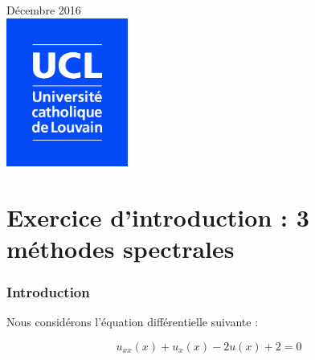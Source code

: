 \documentclass{report}
\begin{document}
\begin{titlepage}


{\large Décembre 2016}\\[1.5cm] %


\includegraphics[width=4cm]{Logo_UCL_SCIENCES.jpg}\\[1cm] %
 

\vfill %

\end{titlepage}


\part{Exercice d'introduction : 3 méthodes spectrales}

\section{Introduction}
Nous considérons l'équation différentielle suivante :

\begin{equation}\label{eq:main}
u_{xx}(x) + u_x(x) - 2u(x) + 2= 0
\end{equation}
\end{document}
